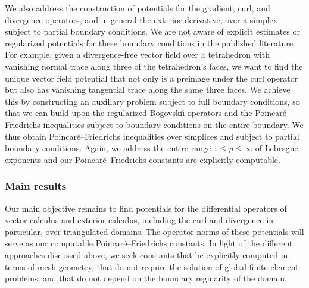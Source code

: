 \documentclass[10pt,a4paper]{article}
\begin{document}
We also address the construction of potentials for the gradient, curl, and divergence operators, and in general the exterior derivative, over a simplex subject to partial boundary conditions. 
We are not aware of explicit estimates or regularized potentials for these boundary conditions in the published literature. 
For example, given a divergence-free vector field over a tetrahedron with vanishing normal trace along three of the tetrahedron's faces, 
we want to find the unique vector field potential that not only is a preimage under the curl operator but also has vanishing tangential trace along the same three faces. 
We achieve this by constructing an auxiliary problem subject to full boundary conditions,
so that we can build upon the regularized Bogovski\u{\i} operators and the Poincar\'e--Friedrichs inequalities subject to boundary conditions on the entire boundary.
We thus obtain Poincar\'e--Friedrichs inequalities over simplices and subject to partial boundary conditions. 
Again, we address the entire range $1 \leq p \leq \infty$ of Lebesgue exponents and our Poincar\'e--Friedrichs constants are explicitly computable. 





\subsubsection{Main results}



Our main objective remains to find potentials for the differential operators of vector calculus and exterior calculus, including the curl and divergence in particular, over triangulated domains. 
The operator norms of these potentials will serve as our computable Poincar\'e--Friedrichs constants.
In light of the different approaches discussed above, 
we seek constants that be explicitly computed in terms of mesh geometry, that do not require the solution of global finite element problems, 
and that do not depend on the boundary regularity of the domain. 

\end{document}
